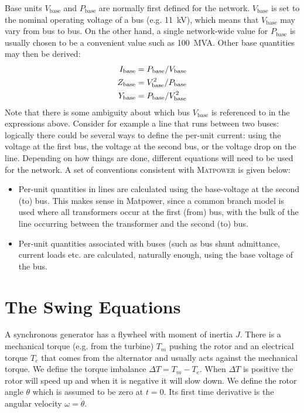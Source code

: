 \documentclass[11pt]{article}
\begin{document}
Base units $V_\text{base}$ and $P_\text{base}$ are normally first defined for the network. $V_\text{base}$ is set to the nominal operating voltage of a bus (e.g. 11~kV), which means that $V_\text{base}$ may vary from bus to bus. On the other hand, a single network-wide value for $P_\text{base}$ is usually chosen to be a convenient value such as 100~MVA. Other base quantities may then be derived:
\begin{align}
	I_\text{base} &= P_\text{base}/V_\text{base} \notag \\
	Z_\text{base} &= V_\text{base}^2 / P_\text{base} \notag \\
	Y_\text{base} &= P_\text{base} / V_\text{base}^2
\end{align}
Note that there is some ambiguity about which bus $V_\text{base}$ is referenced to in the expressions above. Consider for example a line that runs between two buses: logically there could be several ways to define the per-unit current: using the voltage at the first bus, the voltage at the second bus, or the voltage drop on the line. Depending on how things are done, different equations will need to be used for the network. A set of conventions consistent with \textsc{Matpower} is given below:
\begin{itemize}
\item Per-unit quantities in lines are calculated using the base-voltage at the second (to) bus. This makes sense in Matpower, since a common branch model is used where all transformers occur at the first (from) bus, with the bulk of the line occurring between the transformer and the second (to) bus.
\item Per-unit quantities associated with buses (such as bus shunt admittance, current loads etc. are calculated, naturally enough, using the base voltage of the bus.
\end{itemize}

\section{The Swing Equations}
A synchronous generator has a flywheel with moment of inertia $J$. There is a mechanical torque (e.g. from the turbine) $T_m$ pushing the rotor and an electrical torque $T_e$ that comes from the alternator and usually acts against the mechanical torque. We define the torque imbalance $\Delta T = T_m - T_e$. When $\Delta T$ is positive the rotor will speed up and when it is negative it will slow down. We define the rotor angle $\theta$ which is assumed to be zero at $t = 0$. Its first time derivative is the angular velocity $\omega = \dot{\theta}$.
\end{document}
